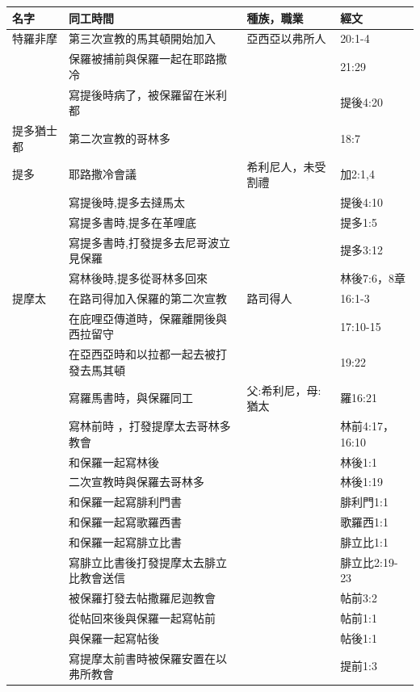 \begin{table}[htbp]
  \centering
    \begin{tabular}{|l|l|l|l|}
    \toprule
   名字 & 同工時間  & 種族，職業 &   經文\\     
    \midrule
 
   特羅非摩  &第三次宣教的馬其頓開始加入&亞西亞以弗所人&20:1-4 \\
    &保羅被捕前與保羅一起在耶路撒冷& &21:29 \\
   &寫提後時病了，被保羅留在米利都 & &提後4:20 \\ \midrule   
       提多猶士都 &第二次宣教的哥林多 & &18:7 \\   \midrule   
    提多  &耶路撒冷會議 &希利尼人，未受割禮 &加2:1,4 \\
    &寫提後時,提多去撻馬太 &  &提後4:10 \\
     &寫提多書時,提多在革哩底 &  &提多1:5 \\
       &寫提多書時,打發提多去尼哥波立見保羅 &  &提多3:12 \\
         &寫林後時,提多從哥林多回來 &  &林後7:6，8章 \\  \midrule    
    提摩太   & 在路司得加入保羅的第二次宣教 &路司得人 & 16:1-3 \\
        &在庇哩亞傳道時，保羅離開後與西拉留守&  &17:10-15 \\         
        &在亞西亞時和以拉都一起去被打發去馬其頓&  &19:22 \\          
    & 寫羅馬書時，與保羅同工  & 父:希利尼，母:猶太 &  羅16:21  \\  
    &寫林前時 ，打發提摩太去哥林多教會  && 林前4:17，16:10 \\   
   & 和保羅一起寫林後  && 林後1:1 \\ 
    & 二次宣教時與保羅去哥林多  &  &  林後1:19  \\ 
    & 和保羅一起寫腓利門書&& 腓利門1:1 \\ 
      & 和保羅一起寫歌羅西書  &&歌羅西1:1 \\  
        & 和保羅一起寫腓立比書  && 腓立比1:1 \\ 
           & 寫腓立比書後打發提摩太去腓立比教會送信  && 腓立比2:19-23 \\  
            &被保羅打發去帖撒羅尼迦教會 && 帖前3:2 \\     
             & 從帖回來後與保羅一起寫帖前 && 帖前1:1 \\                                            
               & 與保羅一起寫帖後 && 帖後1:1 \\        
    & 寫提摩太前書時被保羅安置在以弗所教會  && 提前1:3 \\   

\end{tabular}
\end{table}

